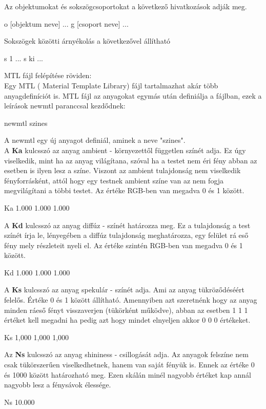 Az objektumokat és sokszögcsoportokat a következő hivatkozások adják meg.
\begin{python}
o [objektum neve]
  ...
  g [csoport neve]
  ...
\end{python}
\bigskip
Sokszögek közötti árnyékolás a következővel állítható
\begin{python}
s 1
  ...
  s ki
  ...
\end{python}

MTL fájl felépítése röviden:\\

Egy MTL ( Material Template Library) fájl tartalmazhat akár több anyagdefiníciót is. MTL fájl az anyagokat egymás után definiálja a fájlban, ezek a leírások newmtl paranccsal kezdődnek:
\begin{python}
newmtl szines
\end{python}
\bigskip
A newmtl egy új anyagot definiál, aminek a neve "szines".\\
A \textbf{Ka} kulcsszó az anyag ambient - környezettől független színét adja. Ez úgy viselkedik, mint ha az anyag világítana, szóval ha a testet nem éri fény abban az esetben is ilyen lesz a színe. Viszont  az ambient tulajdonság nem viselkedik fényforrásként, attól hogy egy testnek ambient színe van az nem fogja megvilágítani a többi testet. Az értéke RGB-ben van megadva 0 és 1 között.
\begin{python}
Ka 1.000 1.000 1.000
\end{python}
\bigskip
A \textbf{Kd} kulcsszó az anyag diffúz -  színét határozza meg. Ez a tulajdonság a test színét írja le, lényegében a diffúz tulajdonság meghatározza, egy felület rá eső fény mely részleteit nyeli el. Az értéke szintén RGB-ben van megadva 0 és 1 között.
\begin{python}
Kd 1.000 1.000 1.000
\end{python}
\bigskip
A \textbf{Ks} kulcsszó az anyag spekulár - színét adja. Ami az anyag tükröződéséért felelős. Értéke 0 és 1 között állítható. Amennyiben azt szeretnénk hogy az anyag minden ráeső fényt visszaverjen (tükörként működve), abban az esetben 1 1 1 értéket kell megadni ha pedig azt hogy mindet elnyeljen akkor 0 0 0 értékeket.
\begin{python}
Ks 1,000 1,000 1,000
\end{python}
\bigskip
Az \textbf{Ns} kulcsszó az anyag shininess - csillogását adja. Az anyagok felszíne nem csak tükörszerűen viselkedhetnek, hanem van saját fényük is. Ennek az értéke 0 és 1000 között határozható meg. Ezen skálán minél nagyobb értéket kap annál nagyobb lesz a fénysávok élessége.
\begin{python}
Ns 10.000
\end{python}

